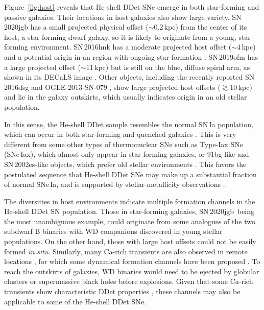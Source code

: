 \documentclass[twocolumn]{aastex631}
\newcommand{\sn}{SN\,2020jgb}
\begin{document}
Figure~\ref{fig:host} reveals that He-shell DDet SNe emerge in both star-forming and passive galaxies.%
Their locations in host galaxies also show large variety. SN\,2020jgb has a small projected physical offset ($\sim$0.2\,kpc) from the center of its host, a star-forming dwarf galaxy, so it is likely to originate from a young, star-forming environment. SN\,2016hnk has a moderate projected host offset ($\sim$4\,kpc) and a potential origin in an  region with ongoing star formation \citep{galbany_16hnk_2019}. SN\,2019ofm has a large projected offset ($\sim$11\,kpc) but is still on the blue, diffuse spiral arm, as shown in its DECaLS image \citep{Dey_2019}. Other objects, including the recently reported SN\,2016dsg and OGLE-2013-SN-079 \citep{Dong_16dsg_2022}, show large projected host offsets ($\gtrsim$10\,kpc) and lie in the galaxy outskirts, which usually indicates origin in an old stellar population.

In this sense, the He-shell DDet sample resembles the normal SN\,Ia population, which can occur in both star-forming and quenched galaxies \citep[e.g.,][]{Sullivan_2006, Smith_2012}. This is very different from some other types of thermonuclear SNe such as Type-Iax SNe (SNe\,Iax), which almost only appear in star-forming galaxies, or 91bg-like and SN\,2002es-like \citep[02es-like;][]{Ganeshalingam_2012} objects, which prefer old stellar environments \citep[see the review by][]{Jha_2019}. This favors the postulated sequence that He-shell DDet SNe may make up a substantial fraction of normal SNe\,Ia, and is supported by stellar-metallicity observations \citep{Sanders_2021, Eitner_2022}.

The diversities in host environments indicate multiple formation channels in the He-shell DDet SN population. Those in star-forming galaxies, \sn\ being the most unambiguous example, could originate from some analogues of the two subdwarf B binaries with WD companions \citep{Geier_2013, Kupfer_2022} discovered in young stellar populations.
On the other hand, those with large host offsets could not be easily formed {\it in situ}. Similarly, many Ca-rich transients are also observed in remote locations \citep[e.g.,][]{Lunnan_2017}, for which some dynamical formation channels have been proposed \citep{Lyman_2014}. To reach the outskirts of galaxies, WD binaries would need to be ejected by globular clusters \citep{Shen_2019} or supermassive black holes \citep{Foley_2015} before explosions. Given that some Ca-rich transients show characteristic DDet properties \citep{de_Ca_rich_2020}, these channels may also be applicable to some of the He-shell DDet SNe. 
\end{document}

